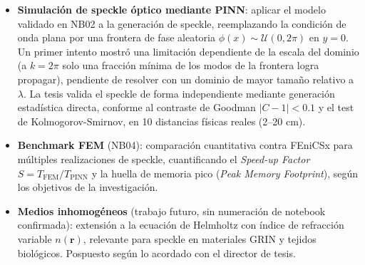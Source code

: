 \begin{itemize}
  \item \textbf{Simulación de speckle óptico mediante PINN}: aplicar el modelo validado
    en NB02 a la generación de speckle, reemplazando la condición de onda plana por una
    frontera de fase aleatoria $\phi(x) \sim \mathcal{U}(0, 2\pi)$ en $y = 0$. Un primer
    intento mostró una limitación dependiente de la escala del dominio (a $k=2\pi$ solo
    una fracción mínima de los modos de la frontera logra propagar), pendiente de
    resolver con un dominio de mayor tamaño relativo a $\lambda$. La tesis valida el
    speckle de forma independiente mediante generación estadística directa, conforme al
    contraste de Goodman $|C - 1| < 0.1$ y el test de Kolmogorov-Smirnov, en 10
    distancias físicas reales (2--20 cm).

  \item \textbf{Benchmark FEM} (NB04): comparación cuantitativa contra FEniCSx para
    múltiples realizaciones de speckle, cuantificando el \textit{Speed-up Factor}
    $S = T_{\mathrm{FEM}} / T_{\mathrm{PINN}}$ \citep{Thuerey2021_PBDL} y la
    huella de memoria pico (\textit{Peak Memory Footprint}), según los objetivos
    de la investigación.

  \item \textbf{Medios inhomogéneos} (trabajo futuro, sin numeración de notebook
    confirmada): extensión a la ecuación de Helmholtz con índice de refracción
    variable $n(\mathbf{r})$, relevante para speckle en materiales GRIN y tejidos
    biológicos. Pospuesto según lo acordado con el director de tesis.
\end{itemize}
